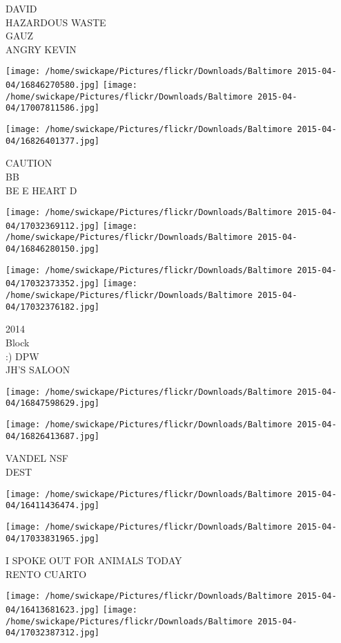 \documentclass[10pt,letterpaper]{article}
\begin{document}
DAVID\\
HAZARDOUS WASTE\\
GAUZ\\
ANGRY KEVIN
\pagebreak

\texttt{[image: /home/swickape/Pictures/flickr/Downloads/Baltimore 2015-04-04/16846270580.jpg]}
\texttt{[image: /home/swickape/Pictures/flickr/Downloads/Baltimore 2015-04-04/17007811586.jpg]}

\vspace{0.25in}
\texttt{[image: /home/swickape/Pictures/flickr/Downloads/Baltimore 2015-04-04/16826401377.jpg]}

CAUTION\\
BB\\
BE E HEART D
\pagebreak

\texttt{[image: /home/swickape/Pictures/flickr/Downloads/Baltimore 2015-04-04/17032369112.jpg]}
\texttt{[image: /home/swickape/Pictures/flickr/Downloads/Baltimore 2015-04-04/16846280150.jpg]}

\texttt{[image: /home/swickape/Pictures/flickr/Downloads/Baltimore 2015-04-04/17032373352.jpg]}
\texttt{[image: /home/swickape/Pictures/flickr/Downloads/Baltimore 2015-04-04/17032376182.jpg]}

2014\\
Block\\
:) DPW\\
JH'S SALOON
\pagebreak

\texttt{[image: /home/swickape/Pictures/flickr/Downloads/Baltimore 2015-04-04/16847598629.jpg]}

\vspace{0.25in}
\texttt{[image: /home/swickape/Pictures/flickr/Downloads/Baltimore 2015-04-04/16826413687.jpg]}

VANDEL NSF\\
DEST
\pagebreak

\texttt{[image: /home/swickape/Pictures/flickr/Downloads/Baltimore 2015-04-04/16411436474.jpg]}

\vspace{0.25in}
\texttt{[image: /home/swickape/Pictures/flickr/Downloads/Baltimore 2015-04-04/17033831965.jpg]}

I SPOKE OUT FOR ANIMALS TODAY\\
RENTO CUARTO
\pagebreak

\texttt{[image: /home/swickape/Pictures/flickr/Downloads/Baltimore 2015-04-04/16413681623.jpg]}
\texttt{[image: /home/swickape/Pictures/flickr/Downloads/Baltimore 2015-04-04/17032387312.jpg]}
\end{document}
